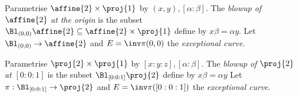 \documentclass{article}
\begin{document}
\begin{definition}
  Parametrise $\affine{2}\times\proj{1}$ by $(x,y),[\alpha:\beta]$. The \emph{blowup
  of $\affine{2}$ at the origin} is the subset $\Bl_{(0,0)}\affine{2}\subseteq\affine{2}\times\proj{1}$
  define by $x\beta = \alpha y$.
  Let $\Bl_{(0,0)}\to\affine{2}$ and $E=\inv\pi(0,0)$ the \emph{exceptional curve}.
\end{definition}

\begin{definition}
  Parametrise $\proj{2}\times\proj{1}$ by $[x:y:z],[\alpha:\beta]$. The \emph{blowup of $\proj{2}$ at
  $[0:0:1]$} is the subset $\Bl_{[0:0:1]}\proj{2}$ define by $x\beta = \alpha y$
  Let $\pi:\Bl_{[0:0:1]}\to\proj{2}$ and $E=\inv\pi([0:0:1])$ the \emph{exceptional curve}.
\end{definition}
\end{document}
